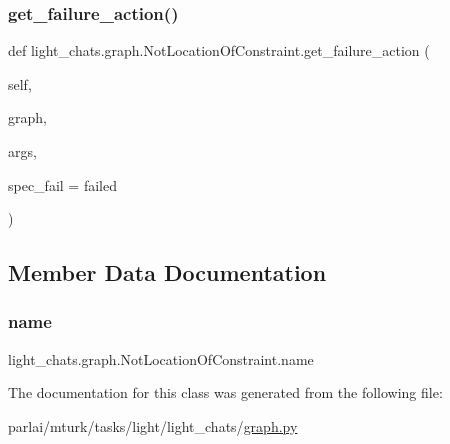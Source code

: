\subsubsection{\texorpdfstring{get\+\_\+failure\+\_\+action()}{get\_failure\_action()}}
{\footnotesize\ttfamily def light\+\_\+chats.\+graph.\+Not\+Location\+Of\+Constraint.\+get\+\_\+failure\+\_\+action (\begin{DoxyParamCaption}\item[{}]{self,  }\item[{}]{graph,  }\item[{}]{args,  }\item[{}]{spec\+\_\+fail = {\ttfamily \textquotesingle{}failed\textquotesingle{}} }\end{DoxyParamCaption})}



\subsection{Member Data Documentation}
\mbox{\label{classlight__chats_1_1graph_1_1NotLocationOfConstraint_ace5fdafd6b230645ba96317bbf254c42}} 
\subsubsection{\texorpdfstring{name}{name}}
{\footnotesize\ttfamily light\+\_\+chats.\+graph.\+Not\+Location\+Of\+Constraint.\+name\hspace{0.3cm}{\ttfamily [static]}}



The documentation for this class was generated from the following file\+:\begin{DoxyCompactItemize}
\item 
parlai/mturk/tasks/light/light\+\_\+chats/\hyperlink{parlai_2mturk_2tasks_2light_2light__chats_2graph_8py}{graph.\+py}\end{DoxyCompactItemize}
